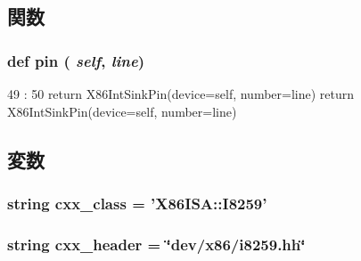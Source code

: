 \subsection{関数}
\hypertarget{classI8259_1_1I8259_a55935323323b227bf5734e0fea2cc88f}{
\subsubsection[{pin}]{\setlength{\rightskip}{0pt plus 5cm}def pin ( {\em self}, \/   {\em line})}}
\label{classI8259_1_1I8259_a55935323323b227bf5734e0fea2cc88f}



\begin{DoxyCode}
49                        :
50         return X86IntSinkPin(device=self, number=line)
        return X86IntSinkPin(device=self, number=line)
\end{DoxyCode}


\subsection{変数}
\hypertarget{classI8259_1_1I8259_a58cd55cd4023648e138237cfc0822ae3}{
\subsubsection[{cxx\_\-class}]{\setlength{\rightskip}{0pt plus 5cm}string {\bf cxx\_\-class} = '{\bf X86ISA::I8259}'}}
\label{classI8259_1_1I8259_a58cd55cd4023648e138237cfc0822ae3}
\hypertarget{classI8259_1_1I8259_a17da7064bc5c518791f0c891eff05fda}{
\subsubsection[{cxx\_\-header}]{\setlength{\rightskip}{0pt plus 5cm}string {\bf cxx\_\-header} = \char`\"{}dev/x86/i8259.hh\char`\"{}}}
\label{classI8259_1_1I8259_a17da7064bc5c518791f0c891eff05fda}


